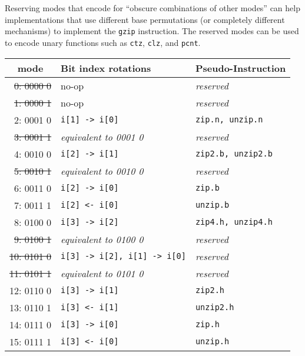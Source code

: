 Reserving modes that encode for ``obscure combinations of other modes'' can help
implementations that use different base permutations (or completely different
mechanisms) to implement the {\tt gzip} instruction. The reserved modes can be
used to encode unary functions such as {\tt ctz}, {\tt clz}, and {\tt pcnt}.

\begin{table}[h]
\begin{small}
\begin{center}
\begin{tabular}{r l l}
\multicolumn{1}{c}{mode} &
Bit index rotations &
Pseudo-Instruction \\

\hline

\sout{ 0: 0000 0} & no-op                            & {\it reserved}         \\
\sout{ 1: 0000 1} & no-op                            & {\it reserved}         \\
       2: 0001 0  & {\tt i[1] -> i[0]}               & {\tt zip.n, unzip.n}   \\
\sout{ 3: 0001 1} & {\it equivalent to 0001 0}       & {\it reserved}         \\
       4: 0010 0  & {\tt i[2] -> i[1]}               & {\tt zip2.b, unzip2.b} \\
\sout{ 5: 0010 1} & {\it equivalent to 0010 0}       & {\it reserved}         \\
       6: 0011 0  & {\tt i[2] -> i[0]}               & {\tt zip.b}            \\
       7: 0011 1  & {\tt i[2] <- i[0]}               & {\tt unzip.b}          \\

\hline

       8: 0100 0  & {\tt i[3] -> i[2]}               & {\tt zip4.h, unzip4.h} \\
\sout{ 9: 0100 1} & {\it equivalent to 0100 0}       & {\it reserved}         \\
\sout{10: 0101 0} & {\tt i[3] -> i[2], i[1] -> i[0]} & {\it reserved}         \\
\sout{11: 0101 1} & {\it equivalent to 0101 0}       & {\it reserved}         \\
      12: 0110 0  & {\tt i[3] -> i[1]}               & {\tt zip2.h}           \\
      13: 0110 1  & {\tt i[3] <- i[1]}               & {\tt unzip2.h}         \\
      14: 0111 0  & {\tt i[3] -> i[0]}               & {\tt zip.h}            \\
      15: 0111 1  & {\tt i[3] <- i[0]}               & {\tt unzip.h}          \\


\end{tabular}
\end{center}
\end{small}
\end{table}
